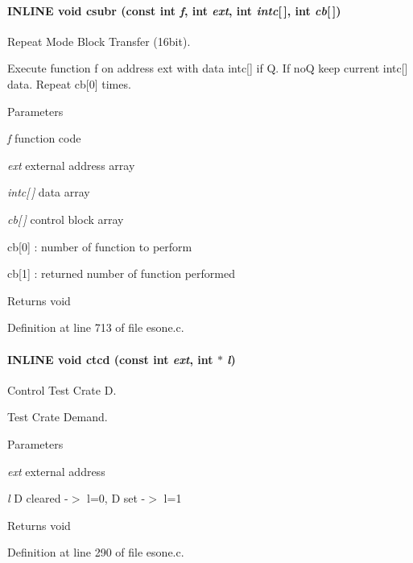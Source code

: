 \paragraph[{csubr}]{\setlength{\rightskip}{0pt plus 5cm}INLINE void csubr (const int {\em f}, \/  int {\em ext}, \/  int {\em intc}\mbox{[}$\,$\mbox{]}, \/  int {\em cb}\mbox{[}$\,$\mbox{]})}\hfill\label{esone_8c_a0a61ab3bc925e399847d6249a43741da}
Repeat Mode Block Transfer (16bit).

Execute function f on address ext with data intc\mbox{[}\mbox{]} if Q. If noQ keep current intc\mbox{[}\mbox{]} data. Repeat cb\mbox{[}0\mbox{]} times.


\begin{DoxyParams}{Parameters}
\item[{\em f}]function code \item[{\em ext}]external address array \item[{\em intc\mbox{[}$\,$\mbox{]}}]data array \item[{\em cb\mbox{[}$\,$\mbox{]}}]control block array \par
 cb\mbox{[}0\mbox{]} : number of function to perform \par
 cb\mbox{[}1\mbox{]} : returned number of function performed \end{DoxyParams}
\begin{DoxyReturn}{Returns}
void 
\end{DoxyReturn}


Definition at line 713 of file esone.c.
\paragraph[{ctcd}]{\setlength{\rightskip}{0pt plus 5cm}INLINE void ctcd (const int {\em ext}, \/  int $\ast$ {\em l})}\hfill\label{esone_8c_ac556218071dba59fa838fde6e94c1d01}
Control Test Crate D.

Test Crate Demand.


\begin{DoxyParams}{Parameters}
\item[{\em ext}]external address \item[{\em l}]D cleared -\/$>$ l=0, D set -\/$>$ l=1 \end{DoxyParams}
\begin{DoxyReturn}{Returns}
void 
\end{DoxyReturn}


Definition at line 290 of file esone.c.
